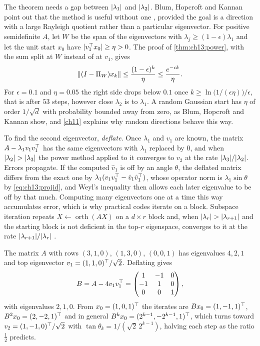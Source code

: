 The theorem needs a gap between $\lvert \lambda_1\rvert$ and $\lvert \lambda_2\rvert$. Blum,
Hopcroft and Kannan point out that the method is useful without one
\cite{blumhopcroftkannan2020}, provided the goal is a direction with a large
Rayleigh quotient rather than a particular eigenvector. For positive semidefinite
$A$, let $W$ be the span of the eigenvectors with $\lambda_j\ge(1-\epsilon)\lambda_1$
and let the unit start $x_0$ have $\lvert v_1^{\top} x_0\rvert\ge\eta>0$. The proof of \cref{thm:ch13:power}, with the
sum split at $W$ instead of at $v_1$, gives
\begin{equation}\label{eq:ch13:gapfree}
\lVert (I-\Pi_W)x_k\rVert\le\frac{(1-\epsilon)^k}{\eta}\le\frac{e^{-\epsilon k}}{\eta}.
\end{equation}
For $\epsilon=0.1$ and $\eta=0.05$ the right side drops below $0.1$ once
$k\ge\ln\big(1/(\epsilon\eta)\big)/\epsilon$, that is after $53$ steps, however close
$\lambda_2$ is to $\lambda_1$. A random Gaussian start has $\eta$ of order
$1/\sqrt d$ with probability bounded away from zero, as Blum, Hopcroft and Kannan
show, and \cref{ch11} explains why random directions behave this way.

To find the second eigenvector, \emph{deflate}. Once $\lambda_1$ and $v_1$ are known,
the matrix $A-\lambda_1v_1v_1^{\top}$ has the same eigenvectors with $\lambda_1$ replaced
by $0$, and when $\lvert \lambda_2\rvert>\lvert \lambda_3\rvert$ the power method applied to it
converges to $v_2$ at the rate $\lvert \lambda_3\rvert/\lvert \lambda_2\rvert$. Errors propagate. If the computed $\hat v_1$ is off by
an angle $\theta$, the deflated matrix differs from the exact one by
$\lambda_1(v_1v_1^{\top}-\hat v_1\hat v_1^{\top})$, whose operator norm is $\lambda_1\sin\theta$
by \cref{eq:ch13:projid}, and Weyl's inequality then allows each later eigenvalue
to be off by that much. Computing many eigenvectors one at a time this way
accumulates error, which is why practical codes iterate on a block. Subspace
iteration repeats $X\leftarrow\operatorname{orth}(AX)$ on a $d\times r$ block and,
when $\lvert \lambda_r\rvert>\lvert \lambda_{r+1}\rvert$ and the starting block is not deficient
in the top-$r$ eigenspace, converges to it at the rate $\lvert \lambda_{r+1}\rvert/\lvert \lambda_r\rvert$
\cite{golubvanloan2013}.

\begin{example}\label{ex:ch13:deflate}
The matrix $A$ with rows $(3,1,0)$, $(1,3,0)$, $(0,0,1)$ has eigenvalues $4,2,1$
and top eigenvector $v_1=(1,1,0)^{\top}/\sqrt2$. Deflating gives
\[
B=A-4v_1v_1^{\top}=\begin{pmatrix}1&-1&0\\-1&1&0\\0&0&1\end{pmatrix},
\]
with eigenvalues $2,1,0$. From $x_0=(1,0,1)^{\top}$ the iterates are
$Bx_0=(1,-1,1)^{\top}$, $B^2x_0=(2,-2,1)^{\top}$ and in general
$B^kx_0=(2^{k-1},-2^{k-1},1)^{\top}$, which turns toward $v_2=(1,-1,0)^{\top}/\sqrt2$ with
$\tan\theta_k=1/(\sqrt2\,2^{k-1})$, halving each step as the ratio $\tfrac12$ predicts.
\end{example}

